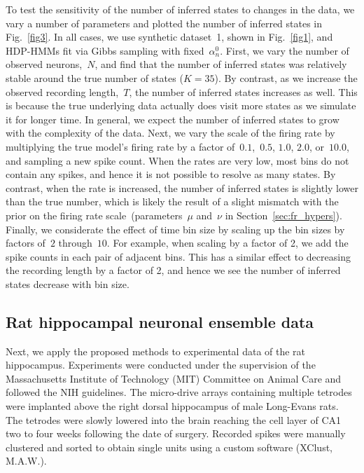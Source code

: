 To test the sensitivity of the number of inferred states to changes in
the data, we vary a number of parameters and plotted the number of
inferred states in Fig.~\ref{fig3}. In all cases, we use synthetic
dataset~1, shown in Fig.~\ref{fig1}, and HDP-HMMs fit via Gibbs
sampling with fixed~$\alpha_n^0$. First, we vary the number of
observed neurons,~$N$, and find that the number of inferred states was
relatively stable around the true number of states ($K=35$). By
contrast, as we increase the observed recording length,~$T$, the
number of inferred states increases as well. This is because the true
underlying data actually does visit more states as we simulate it for
longer time. In general, we expect the number of inferred states to
grow with the complexity of the data. Next, we vary the scale of the
firing rate by multiplying the true model's firing rate by a factor
of~$0.1$,~$0.5$, $1.0$, $2.0$, or~$10.0$, and sampling a new spike
count. When the rates are very low, most bins do not contain any
spikes, and hence it is not possible to resolve as many states. By
contrast, when the rate is increased, the number of inferred states is
slightly lower than the true number, which is likely the result of a
slight mismatch with the prior on the firing rate
scale~(parameters~$\mu$ and~$\nu$ in
Section~\ref{sec:fr_hypers}). Finally, we considerate the effect of
time bin size by scaling up the bin sizes by factors of~$2$
through~$10$. For example, when scaling by a factor of 2, we add the
spike counts in each pair of adjacent bins. This has a similar effect
to decreasing the recording length by a factor of 2, and hence we see
the number of inferred states decrease with bin size.

 \subsection{Rat hippocampal neuronal ensemble data} 

Next, we apply the proposed methods to experimental data of the rat
hippocampus.  Experiments were conducted under the supervision of the
Massachusetts Institute of Technology (MIT) Committee on Animal Care
and followed the NIH guidelines.  The micro-drive arrays containing
multiple tetrodes were implanted above the right dorsal hippocampus of
male Long-Evans rats. The tetrodes were slowly lowered into the brain
reaching the cell layer of CA1 two to four weeks following the date of
surgery. Recorded spikes were manually clustered and sorted to obtain
single units using a custom software (XClust, M.A.W.).


